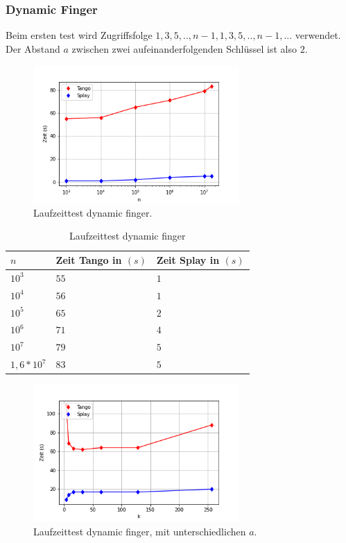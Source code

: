 \documentclass[a4paper,12pt]{article}
\begin{document}
\subsubsection{Dynamic Finger}
Beim ersten test wird Zugriffsfolge $1, 3, 5,..,n-1, 1, 3, 5, .., n-1,...$ verwendet. Der Abstand $a$ zwischen zwei aufeinanderfolgenden Schlüssel ist also $2$.
\begin{figure}[H]
	\centering
	\includegraphics[width=0.7\textwidth]{"Medien/laufzeittest/diagramm/dynamicfinger"}
	\caption{Laufzeittest dynamic finger.}
\end{figure}
\begin{table}[H]
	\begin{center}
		\begin{tabular}[c]{|l|l|l|}
			\hline
			$n$ & Zeit Tango in $\left(s\right)$ &Zeit Splay in $\left(s\right)$ \\
			\hline
			$10^3$ & $55$ &$1$ \\
			\hline
			$10^4$  & $56$ &$1$  \\
			\hline
			$10^5$  & $65$ &$2$  \\
			\hline
			$10^6$  & $71$ &$4$  \\
			\hline
			$10^7$  & $79$ &$5$  \\
			\hline
			$1,6 *10^7$  & $83$ &$5$  \\
			\hline
		\end{tabular}
		\caption{Laufzeittest dynamic finger} 
	\end{center}
\end{table}
\begin{figure}[H]
	\centering
	\includegraphics[width=0.7\textwidth]{"Medien/laufzeittest/diagramm/dynamicfingerNfest"}
	\caption{Laufzeittest dynamic finger, mit unterschiedlichen $a$.}
\end{figure}
\end{document}
